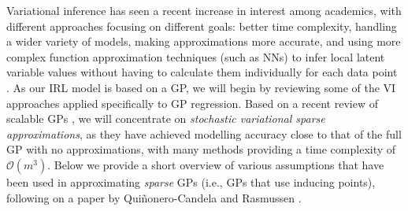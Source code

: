 \documentclass{mprop}
\theoremstyle{definition}
\begin{document}
Variational inference has seen a recent increase in interest among academics,
with different approaches focusing on different goals: better time complexity,
handling a wider variety of models, making approximations more accurate, and
using more complex function approximation techniques (such as NNs)
to infer local latent variable values without having to calculate them
individually for each data point \cite{DBLP:journals/corr/abs-1711-05597}. As
our IRL model is based on a GP, we will begin by reviewing some of the VI
approaches applied specifically to GP regression. Based on a recent review of
scalable GPs \cite{DBLP:journals/corr/abs-1711-05597}, we will concentrate on
\emph{stochastic variational sparse approximations}, as they have achieved
modelling accuracy close to that of the full GP with no approximations, with
many methods providing a time complexity of $\mathcal{O}(m^3)$. Below we provide
a short overview of various assumptions that have been used in approximating
\emph{sparse} GPs (i.e., GPs that use inducing points), following on a paper by
Qui\~{n}onero-Candela and Rasmussen \cite{DBLP:journals/jmlr/CandelaR05}.
\end{document}
